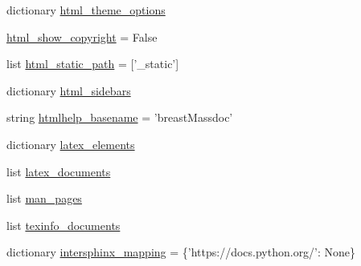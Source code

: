 \begin{DoxyCompactItemize}
dictionary \hyperlink{namespaceconf_aeaafa42217d24810edc9b116b88a4585}{html\-\_\-theme\-\_\-options}
\item 
\hyperlink{namespaceconf_aef058dc18c5e6a45d2cebad007a465c7}{html\-\_\-show\-\_\-copyright} = False
\item 
list \hyperlink{namespaceconf_af4fb5d8851ccaade135c2668dd3ced41}{html\-\_\-static\-\_\-path} = \mbox{[}'\-\_\-static'\mbox{]}
\item 
dictionary \hyperlink{namespaceconf_a3f3b198d720ed6fab15e95fa2479adb6}{html\-\_\-sidebars}
\item 
string \hyperlink{namespaceconf_aab7fddb2766ce3c430d8246fbfdbc7b1}{htmlhelp\-\_\-basename} = 'breast\-Massdoc'
\item 
dictionary \hyperlink{namespaceconf_a33619d385ad23765ac6ebb58bf82d43d}{latex\-\_\-elements}
\item 
list \hyperlink{namespaceconf_a7812f49970f3de0d15dd7b9b9a10e3a1}{latex\-\_\-documents}
\item 
list \hyperlink{namespaceconf_a85efc5fee48a26fa2d651f6eeb38fc2b}{man\-\_\-pages}
\item 
list \hyperlink{namespaceconf_a54b0faed214ac92017d5689efbb10672}{texinfo\-\_\-documents}
\item 
dictionary \hyperlink{namespaceconf_a8375f4f963de3ac8026eaa9beced9564}{intersphinx\-\_\-mapping} = \{'https\-://docs.\-python.\-org/'\-: None\}
\end{DoxyCompactItemize}


